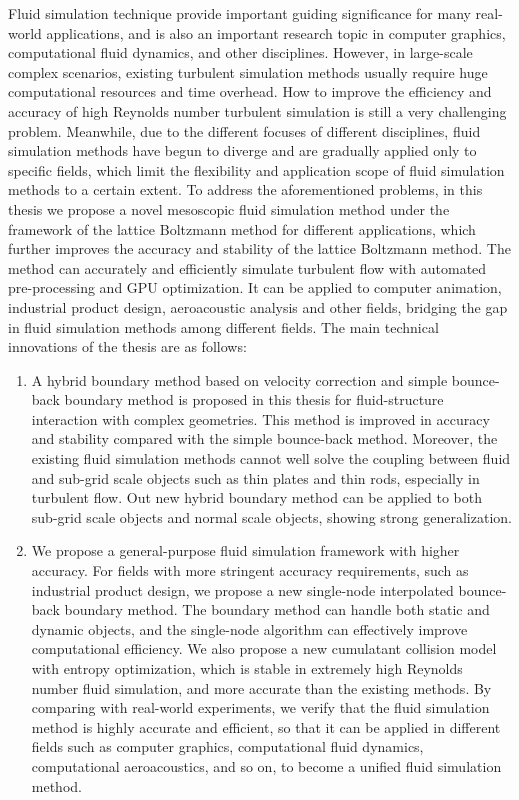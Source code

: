 \begin{abstract*}[flattitle]
  Fluid simulation technique provide important guiding significance for many real-world applications, and is also an important research topic in computer graphics, computational fluid dynamics, and other disciplines.
  However, in large-scale complex scenarios, existing turbulent simulation methods usually require huge computational resources and time overhead.
  How to improve the efficiency and accuracy of high Reynolds number turbulent simulation is still a very challenging problem.
  Meanwhile, due to the different focuses of different disciplines, fluid simulation methods have begun to diverge and are gradually applied only to specific fields, which limit the flexibility and application scope of fluid simulation methods to a certain extent.
  To address the aforementioned problems, in this thesis we propose a novel mesoscopic fluid simulation method under the framework of the lattice Boltzmann method for different applications, which further improves the accuracy and stability of the lattice Boltzmann method. The method can accurately and efficiently simulate turbulent flow with automated pre-processing and GPU optimization. It can be applied to computer animation, industrial product design, aeroacoustic analysis and other fields, bridging the gap in fluid simulation methods among different fields. The main technical innovations of the thesis are as follows:
  \begin{enumerate}
    \item A hybrid boundary method based on velocity correction and simple bounce-back boundary method is proposed in this thesis for fluid-structure interaction with complex geometries. This method is improved in accuracy and stability compared with the simple bounce-back method. Moreover, the existing fluid simulation methods cannot well solve the coupling between fluid and sub-grid scale objects such as thin plates and thin rods, especially in turbulent flow. Out new hybrid boundary method can be applied to both sub-grid scale objects and normal scale objects, showing strong generalization.
    \item We propose a general-purpose fluid simulation framework with higher accuracy. For fields with more stringent accuracy requirements, such as industrial product design, we propose a new single-node interpolated bounce-back boundary method. The boundary method can handle both static and dynamic objects, and the single-node algorithm can effectively improve computational efficiency. We also propose a new cumulatant collision model with entropy optimization, which is stable in extremely high Reynolds number fluid simulation, and more accurate than the existing methods. By comparing with real-world experiments, we verify that the fluid simulation method is highly accurate and efficient, so that it can be applied in different fields such as computer graphics, computational fluid dynamics, computational aeroacoustics, and so on, to become a unified fluid simulation method.

\end{enumerate}
\end{abstract*}
